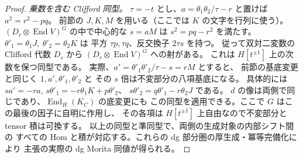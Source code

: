 \begin{proof}
\emph{乗数を含む Clifford 同型。}
$\tau=-t$ とし、$a=\theta_1\theta_2/\tau-r$ と置けば $a^2=r^2-pq$。
前節の $J,K,M$ を用いる（ここでは $K$ の文字を行列に使う）。
$(D_r\otimes\operatorname{End}V)^G$ の中で中心的な $s=aM$ は
$s^2=pq-r^2$ を満たす。
$\theta'_1=\theta_1J,\ \theta'_2=\theta_2K$ は
平方 $\tau p,\tau q$、反交換子 $2\tau s$ を持つ。
従って双対二変数の Clifford 代数 $D_s$ から
$(D_r\otimes\operatorname{End}V)^G$ への射がある。
これは $H[t^{\pm1}]$ 上の次数を保つ同型である。
実際、$a'=\theta'_1\theta'_2/\tau-s=rM$ とすると、
前節の基底変更と同じく $1,a',\theta'_1,\theta'_2$ と
その $s$ 倍は不変部分の八項基底になる。
具体的には $sa'=-ra$, $s\theta'_1=-r\theta_1 K+p\theta'_2$、
$s\theta'_2=q\theta'_1-r\theta_2J$ である。
$d$ の像は両側で同じであり、$\operatorname{End}_H(K_C)$ の底変更にも
この同型を適用できる。ここで $G$ はこの最後の因子に自明に作用し、
その各項は $H[t^{\pm1}]$ 上自由なので不変部分と tensor 積は可換する。
以上の同型と準同型で、両側の生成対象の内部シフト間の
すべての Hom と積が対応する。これらの dg 部分圏の厚生成・冪等完備化により
主張の実際の dg Morita 同値が得られる。
\end{proof}
